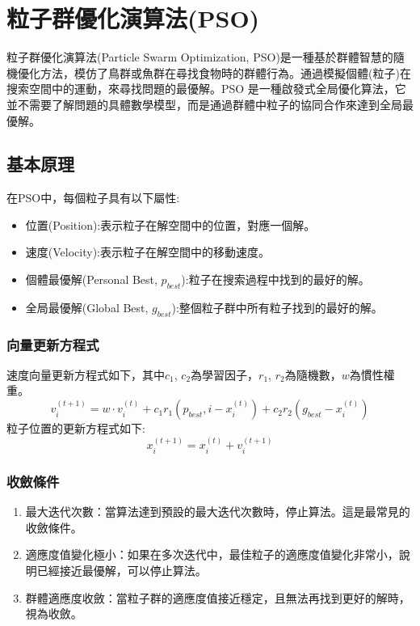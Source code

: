 \section{粒子群優化演算法(PSO)}
粒子群優化演算法(Particle Swarm Optimization, PSO)是一種基於群體智慧的隨機優化方法，模仿了鳥群或魚群在尋找食物時的群體行為。通過模擬個體(粒子)在搜索空間中的運動，來尋找問題的最優解。PSO 是一種啟發式全局優化算法，它並不需要了解問題的具體數學模型，而是通過群體中粒子的協同合作來達到全局最優解。
\subsection{基本原理}
在PSO中，每個粒子具有以下屬性:
\begin{itemize}
    \item 位置(Position):表示粒子在解空間中的位置，對應一個解。
    \item 速度(Velocity):表示粒子在解空間中的移動速度。
    \item 個體最優解(Personal Best, $p_{best}$​):粒子在搜索過程中找到的最好的解。
    \item 全局最優解(Global Best, $g_{best}$):整個粒子群中所有粒子找到的最好的解。
\end{itemize}

\subsubsection{向量更新方程式}
速度向量更新方程式如下，其中$c_1$, $c_2$為學習因子，$r_1$, $r_2$為隨機數，$w$為慣性權重。
\begin{equation} \label{eq:PSO_velocity}
    v_{i}^{(t+1)} = w \cdot v_{i}^{(t)} + c_{1}r_{1}(p_{best}, i - x_{i}^{(t)}) + c_{2}r_{2}(g_{best} - x_{i}^{(t)})
\end{equation}
粒子位置的更新方程式如下:
\begin{equation} \label{eq:PSO_position}
    x_{i}^{(t+1)} = x_{i}^{(t)} + v_{i}^{(t+1)}
\end{equation}

\subsubsection{收斂條件}
\begin{enumerate}
    \item 最大迭代次數：當算法達到預設的最大迭代次數時，停止算法。這是最常見的收斂條件。
    \item 適應度值變化極小：如果在多次迭代中，最佳粒子的適應度值變化非常小，說明已經接近最優解，可以停止算法。
    \item 群體適應度收斂：當粒子群的適應度值接近穩定，且無法再找到更好的解時，視為收斂。
\end{enumerate}


